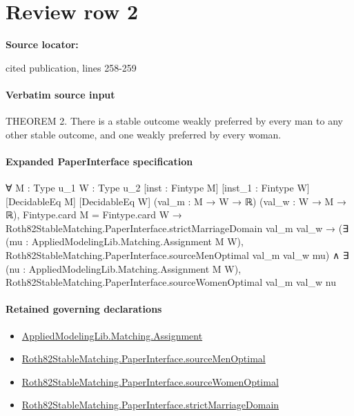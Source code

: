 \documentclass[10pt]{article}
\begin{document}
\section*{Review row 2}
\textbf{Source locator:} {\footnotesize\raggedright cited publication, lines 258-\allowbreak{}259\par}
\paragraph{Verbatim source input}
\begin{ReviewVerbatim}
THEOREM 2. There is a stable outcome weakly preferred by every man to any other
stable outcome, and one weakly preferred by every woman.
\end{ReviewVerbatim}



\paragraph{Expanded PaperInterface specification}
\begin{ReviewVerbatim}
∀ {M : Type u_1} {W : Type u_2} [inst : Fintype M] [inst_1 : Fintype W] [DecidableEq M] [DecidableEq W]
  (val_m : M → W → ℝ) (val_w : W → M → ℝ),
  Fintype.card M = Fintype.card W →
    Roth82StableMatching.PaperInterface.strictMarriageDomain val_m val_w →
      (∃ (mu : AppliedModelingLib.Matching.Assignment M W),
          Roth82StableMatching.PaperInterface.sourceMenOptimal val_m val_w mu) ∧
        ∃ (nu : AppliedModelingLib.Matching.Assignment M W),
          Roth82StableMatching.PaperInterface.sourceWomenOptimal val_m val_w nu
\end{ReviewVerbatim}

\paragraph{Retained governing declarations}
\begin{itemize}\raggedright
\item \hyperlink{governing-declaration-508c084086b006b8}{Applied\allowbreak{}Modeling\allowbreak{}Lib.\allowbreak{}Matching.\allowbreak{}Assignment}
\item \hyperlink{paper-prerequisite-44aa864d4a515095}{Roth82\allowbreak{}Stable\allowbreak{}Matching.\allowbreak{}Paper\allowbreak{}Interface.\allowbreak{}source\allowbreak{}Men\allowbreak{}Optimal}
\item \hyperlink{paper-prerequisite-6c23e95d9facee8d}{Roth82\allowbreak{}Stable\allowbreak{}Matching.\allowbreak{}Paper\allowbreak{}Interface.\allowbreak{}source\allowbreak{}Women\allowbreak{}Optimal}
\item \hyperlink{governing-declaration-d06ec2a2987f0c72}{Roth82\allowbreak{}Stable\allowbreak{}Matching.\allowbreak{}Paper\allowbreak{}Interface.\allowbreak{}strict\allowbreak{}Marriage\allowbreak{}Domain}
\end{itemize}
\end{document}
